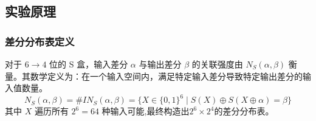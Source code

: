 \subsection{实验原理}
\subsubsection{差分分布表定义}
对于 $6 \to 4$ 位的 S 盒，输入差分 $\alpha$ 与输出差分 $\beta$ 的关联强度由 $N_S(\alpha, \beta)$ 衡量。其数学定义为：在一个输入空间内，满足特定输入差分导致特定输出差分的输入值数量。
$$ N_S(\alpha, \beta) = \# IN_S(\alpha,\beta) =  \{ X \in \{0,1\}^6 \mid S(X) \oplus S(X \oplus \alpha) = \beta \} $$
其中 $X$ 遍历所有 $ 2 ^ 6 = 64$ 种输入可能,最终构造出$2^6 \times 2^4$的差分分布表。